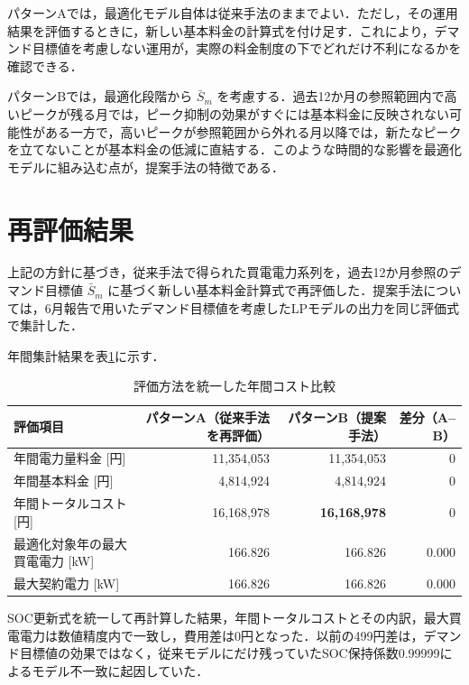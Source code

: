 \documentclass[a4paper,11pt,dvipdfmx]{jsarticle}
\begin{document}
パターンAでは，最適化モデル自体は従来手法のままでよい．ただし，その運用結果を評価するときに，新しい基本料金の計算式を付け足す．これにより，デマンド目標値を考慮しない運用が，実際の料金制度の下でどれだけ不利になるかを確認できる．

パターンBでは，最適化段階から $\bar{S}_{m}$ を考慮する．過去12か月の参照範囲内で高いピークが残る月では，ピーク抑制の効果がすぐには基本料金に反映されない可能性がある一方で，高いピークが参照範囲から外れる月以降では，新たなピークを立てないことが基本料金の低減に直結する．このような時間的な影響を最適化モデルに組み込む点が，提案手法の特徴である．

\section{再評価結果}
上記の方針に基づき，従来手法で得られた買電電力系列を，過去12か月参照のデマンド目標値 $\bar{S}_{m}$ に基づく新しい基本料金計算式で再評価した．提案手法については，6月報告で用いたデマンド目標値を考慮したLPモデルの出力を同じ評価式で集計した．

年間集計結果を表\ref{tab:reassessment_results}に示す．

\begin{table}[H]
    \centering
    \caption{評価方法を統一した年間コスト比較}
    \label{tab:reassessment_results}
    \begin{tabular}{lrrr}
        \toprule
        評価項目                   & パターンA（従来手法を再評価） & パターンB（提案手法）     & 差分（A--B） \\
        \midrule
        年間電力量料金 [円]            & 11,354,053         & 11,354,053       & 0      \\
        年間基本料金 [円]             & 4,814,924          & 4,814,924        & 0       \\
        年間トータルコスト [円]          & 16,168,978         & \textbf{16,168,978} & 0      \\
        最適化対象年の最大買電電力 [kW]     & 166.826            & 166.826          & 0.000    \\
        最大契約電力 [kW]          & 166.826            & 166.826          & 0.000    \\
        \bottomrule
    \end{tabular}
\end{table}

SOC更新式を統一して再計算した結果，年間トータルコストとその内訳，最大買電電力は数値精度内で一致し，費用差は0円となった．以前の499円差は，デマンド目標値の効果ではなく，従来モデルにだけ残っていたSOC保持係数0.99999によるモデル不一致に起因していた．
\end{document}
